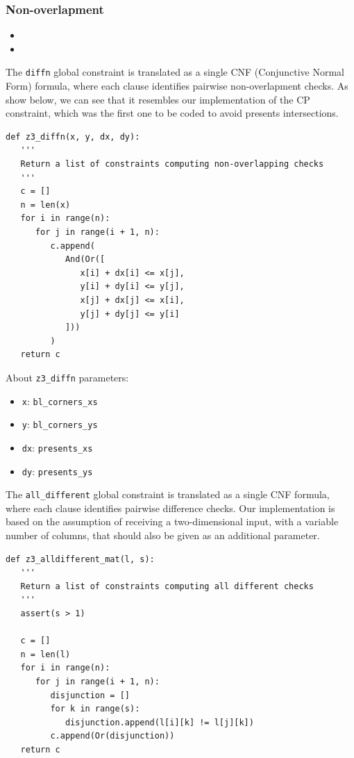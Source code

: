 \documentclass[a4paper,10pt]{article}
\newcounter{subsubsubsection}[subsubsection]
\begin{document}
\subsubsection{Non-overlapment}
\begin{itemize}
   \item {}
   \item {}
\end{itemize}

 \label{sec:smt-diffn}
The \texttt{diffn} global constraint is translated as a single CNF (Conjunctive Normal Form) formula, where each clause identifies pairwise non-overlapment checks. As show below, we can see that it resembles our implementation of the  CP constraint, which was the first one to be coded to avoid presents intersections.

\begin{verbatim}
def z3_diffn(x, y, dx, dy):
   '''
   Return a list of constraints computing non-overlapping checks
   '''
   c = []
   n = len(x)
   for i in range(n):
      for j in range(i + 1, n):
         c.append(
            And(Or([
               x[i] + dx[i] <= x[j],
               y[i] + dy[i] <= y[j],
               x[j] + dx[j] <= x[i],
               y[j] + dy[j] <= y[i]
            ]))
         )
   return c
\end{verbatim}

About \texttt{z3\_diffn} parameters:
\begin{itemize}
   \item \texttt{x}: \texttt{bl\_corners\_xs}
   \item \texttt{y}: \texttt{bl\_corners\_ys}
   \item \texttt{dx}: \texttt{presents\_xs}
   \item \texttt{dy}: \texttt{presents\_ys}
\end{itemize}

 \label{sec:smt-all-different}
The \texttt{all\_different} global constraint is translated as a single CNF formula, where each clause identifies pairwise difference checks. Our implementation is based on the assumption of receiving a two-dimensional input, with a variable number of columns, that should also be given as an additional parameter. 

\begin{verbatim}
def z3_alldifferent_mat(l, s):
   '''
   Return a list of constraints computing all different checks
   '''
   assert(s > 1)
   
   c = []
   n = len(l)
   for i in range(n):
      for j in range(i + 1, n):
         disjunction = []
         for k in range(s):
            disjunction.append(l[i][k] != l[j][k])
         c.append(Or(disjunction))
   return c
\end{verbatim}
\end{document}
